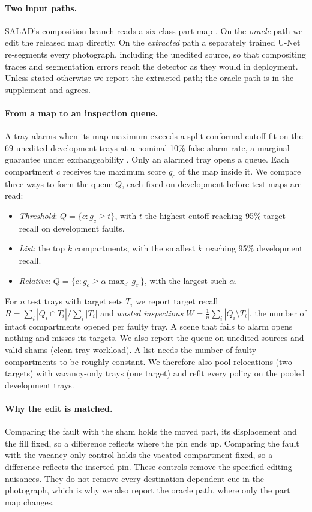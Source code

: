 \paragraph{Two input paths.}
SALAD's composition branch reads a six-class part map \cite{fucka2025}. On the \emph{oracle} path we edit the released map directly. On the \emph{extracted} path a separately trained U-Net re-segments every photograph, including the unedited source, so that compositing traces and segmentation errors reach the detector as they would in deployment. Unless stated otherwise we report the extracted path; the oracle path is in the supplement and agrees.

\paragraph{From a map to an inspection queue.}
A tray alarms when its map maximum exceeds a split-conformal cutoff fit on the 69 unedited development trays at a nominal 10\% false-alarm rate, a marginal guarantee under exchangeability \cite{bates2023,angelopoulos2023}. Only an alarmed tray opens a queue. Each compartment $c$ receives the maximum score $g_c$ of the map inside it. We compare three ways to form the queue $Q$, each fixed on development before test maps are read:
\begin{itemize}\setlength\itemsep{0pt}
\item \emph{Threshold}: $Q=\{c: g_c\ge t\}$, with $t$ the highest cutoff reaching 95\% target recall on development faults.
\item \emph{List}: the top $k$ compartments, with the smallest $k$ reaching 95\% development recall.
\item \emph{Relative}: $Q=\{c: g_c\ge \alpha\max_{c'} g_{c'}\}$, with the largest such $\alpha$.
\end{itemize}
For $n$ test trays with target sets $T_i$ we report target recall $R=\sum_i|Q_i\cap T_i|/\sum_i|T_i|$ and \emph{wasted inspections} $W=\frac1n\sum_i|Q_i\setminus T_i|$, the number of intact compartments opened per faulty tray. A scene that fails to alarm opens nothing and misses its targets. We also report the queue on unedited sources and valid shams (clean-tray workload). A list needs the number of faulty compartments to be roughly constant. We therefore also pool relocations (two targets) with vacancy-only trays (one target) and refit every policy on the pooled development trays.

\paragraph{Why the edit is matched.}
Comparing the fault with the sham holds the moved part, its displacement and the fill fixed, so a difference reflects where the pin ends up. Comparing the fault with the vacancy-only control holds the vacated compartment fixed, so a difference reflects the inserted pin. These controls remove the specified editing nuisances. They do not remove every destination-dependent cue in the photograph, which is why we also report the oracle path, where only the part map changes.

